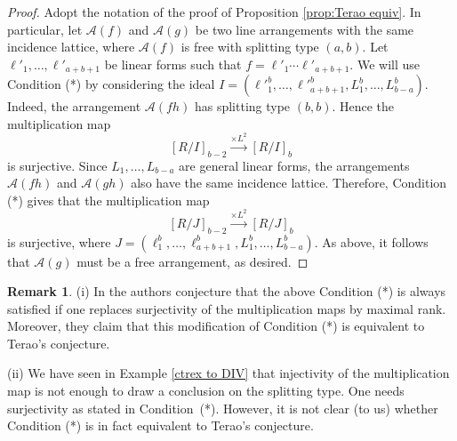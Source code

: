\documentclass[12pt]{amsart}
\numberwithin{equation}{section}
\theoremstyle{definition}
\newtheorem{remark}[theorem]{Remark}
\begin{document}
\begin{proof} 
Adopt the notation of the proof of Proposition \ref{prop:Terao equiv}. In particular, let  ${\mathcal{A}} (f)$ and ${\mathcal{A}} (g)$ be two line arrangements with the same incidence lattice, where ${\mathcal{A}} (f)$ is free with splitting type $(a, b)$.   Let $\ell'_1,\ldots,\ell'_{a+b+1}$ be linear forms such that $f = \ell'_1 \cdots \ell'_{a+b+1}$. We will use Condition (*) by considering the ideal $I = (\ell'^b_1,\dots, \ell'^b_{a+b+1}, L_1^b,\ldots,L_{b-a}^b)$. Indeed, the arrangement ${\mathcal{A}} (f h)$ has splitting type $(b, b)$. Hence the multiplication map 
\[
[R/I]_{b-2} \stackrel{\times L^2}{\longrightarrow} [R/I]_b
\]
is surjective. Since $L_1,\ldots,L_{b-a}$ are general linear forms, the arrangements ${\mathcal{A}} (fh)$ and ${\mathcal{A}} (gh)$ also have the same incidence lattice. Therefore, Condition (*) gives that  the  multiplication map 
\[
[R/J]_{b-2} \stackrel{\times L^2}{\longrightarrow} [R/J]_b
\]
is surjective, where $J =  (\ell^b_1,\dots, \ell^b_{a+b+1}, L_1^b,\ldots,L_{b-a}^b)$. As above, it follows that ${\mathcal{A}} (g)$ must be a free arrangement, as desired. 
\end{proof}

\begin{remark}
(i) In \cite{DIV} the authors conjecture that the above Condition (*) is always satisfied if one replaces surjectivity of the multiplication maps by maximal rank. Moreover, they claim that this modification of Condition (*) is equivalent to Terao's conjecture. 

(ii) We have seen in Example \ref{ctrex to DIV} that injectivity of the multiplication map is not enough to draw a conclusion on the splitting type. One  needs surjectivity as stated in Condition~(*). However, it is not clear (to us) whether Condition (*) is in fact equivalent to Terao's conjecture. 
\end{remark}
\end{document}
